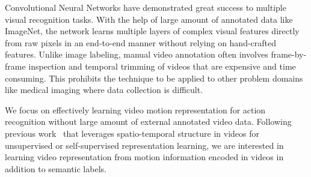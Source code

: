 \documentclass[10pt,twocolumn,letterpaper]{article}
\begin{document}

Convolutional Neural Networks have demonstrated great success to multiple visual recognition tasks.
With the help of large amount of annotated data like ImageNet, the network learns multiple layers of complex visual features directly from raw pixels in an end-to-end manner without relying on hand-crafted features. 
Unlike image labeling, manual video annotation often involves frame-by-frame inspection and temporal trimming of videos that are expensive and time consuming. 
This prohibits the technique to be applied to other problem domains like medical imaging where data collection is difficult.

We focus on effectively learning video motion representation for action recognition without large amount of external annotated video data.
Following previous work~\cite{misra2016shuffle,vondrick2016generating,fernando2016self} that leverages spatio-temporal structure in videos for unsupervised or self-supervised representation learning, we are interested in learning video representation from motion information encoded in videos in addition to semantic labels.
\end{document}
